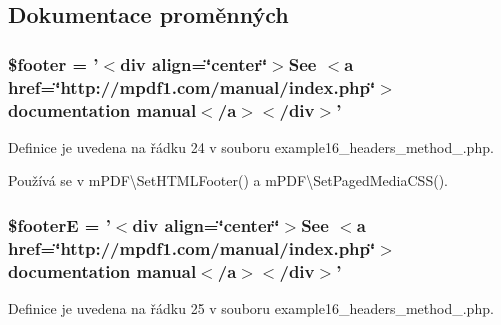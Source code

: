 \subsection{Dokumentace proměnných}
\hypertarget{example16__headers__method__2_8php_abaa4216c852c51c380dd8f10d3cfe944}{
\subsubsection[{\$footer}]{\setlength{\rightskip}{0pt plus 5cm}\$footer = '$<$div align=\char`\"{}center\char`\"{}$>$See $<$a href=\char`\"{}http\-://mpdf1.\-com/manual/index.\-php\char`\"{}$>$documentation manual$<$/a$>$$<$/div$>$'}}\label{example16__headers__method__2_8php_abaa4216c852c51c380dd8f10d3cfe944}


Definice je uvedena na řádku 24 v souboru example16\-\_\-headers\-\_\-method\-\_.\-php.



Používá se v m\-P\-D\-F\textbackslash{}\-Set\-H\-T\-M\-L\-Footer() a m\-P\-D\-F\textbackslash{}\-Set\-Paged\-Media\-C\-S\-S().

\hypertarget{example16__headers__method__2_8php_a11a5e15badebbec27b59acdf150c2a63}{
\subsubsection[{\$footer\-E}]{\setlength{\rightskip}{0pt plus 5cm}\$footer\-E = '$<$div align=\char`\"{}center\char`\"{}$>$See $<$a href=\char`\"{}http\-://mpdf1.\-com/manual/index.\-php\char`\"{}$>$documentation manual$<$/a$>$$<$/div$>$'}}\label{example16__headers__method__2_8php_a11a5e15badebbec27b59acdf150c2a63}


Definice je uvedena na řádku 25 v souboru example16\-\_\-headers\-\_\-method\-\_.\-php.

